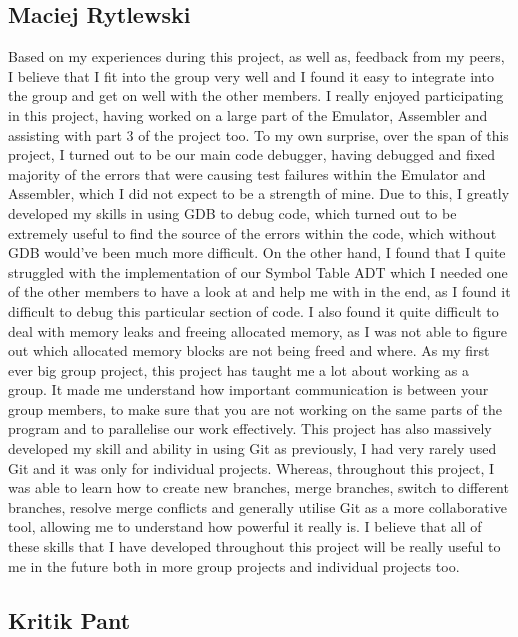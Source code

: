 \documentclass[11pt]{article}
\begin{document}
\subsection{Maciej Rytlewski}

Based on my experiences during this project, as well as, feedback from my peers, I believe that I fit into the group very well and I found it easy to integrate into 
the group and get on well with the other members. I really enjoyed participating in this project, having worked on a large part of the Emulator, Assembler and assisting with part 3 
of the project too. To my own surprise, over the span of this project, I turned out to be our main code debugger, having debugged and fixed majority of the errors that were causing test failures 
within the Emulator and Assembler, which I did not expect to be a strength of mine. Due to this, I greatly developed my skills in using GDB to debug code, which turned out to be 
extremely useful to find the source of the errors within the code, which without GDB would've been much more difficult. On the other hand, I found that I quite struggled with 
the implementation of our Symbol Table ADT which I needed one of the other members to have a look at and help me with in the end, as I found it difficult to debug this particular 
section of code. I also found it quite difficult to deal with memory leaks and freeing allocated memory, as I was not able to figure out which allocated memory blocks are not being freed and where.
\newline
As my first ever big group project, this project has taught me a lot about working as a group. It made me understand how important communication is between your group members, to make sure 
that you are not working on the same parts of the program and to parallelise our work effectively. This project has also massively developed my skill and ability in using Git as previously, I had 
very rarely used Git and it was only for individual projects. Whereas, throughout this project, I was able to learn how to create new branches, merge branches, switch to different branches, resolve merge 
conflicts and generally utilise Git as a more collaborative tool, allowing me to understand how powerful it really is. I believe that all of these skills that I have developed throughout this project 
will be really useful to me in the future both in more group projects and individual projects too.

\subsection{Kritik Pant}
\end{document}
